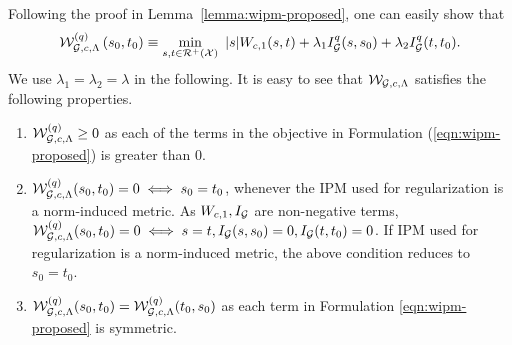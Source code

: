 Following the proof in Lemma~\ref{lemma:wipm-proposed}, one can easily show that
\begin{equation}\label{eqn:wipm-proposed}
    \mathcal{W}_{\mathcal{G}, c, \Lambda}^{(q)}\left(s_0,t_0\right) \equiv\min\limits_{s,t\in\mathcal{R}^+(\mathcal{X})}\  |s| W_{c, 1}(s,t) + \lambda_1  I_{\mathcal{G}}^q(s,s_0) + \lambda_2  I_{\mathcal{G}}^q(t,t_0).
\end{equation}
We use $\lambda_1=\lambda_2=\lambda$ in the following. 
It is easy to see that $\mathcal{W}_{\mathcal{G}, c, \Lambda}$ satisfies the following properties.
\begin{enumerate}
    \item $\mathcal{W}_{\mathcal{G}, c, \Lambda}^{(q)}\geq 0$ as each of the terms in the objective in Formulation (\ref{eqn:wipm-proposed}) is greater than 0.
    \item $\mathcal{W}_{\mathcal{G}, c, \Lambda}^{(q)}(s_0, t_0)=0\iff s_0=t_0$, whenever the IPM used for regularization is a norm-induced metric. As $W_{c, 1},  I_{\mathcal{G}}$ are non-negative terms, $\mathcal{W}_{\mathcal{G}, c, \Lambda}^{(q)}(s_0, t_0)=0\iff s=t,  I_{\mathcal{G}}(s, s_0)=0,  I_{\mathcal{G}}(t, t_0)=0$. If IPM used for regularization is a norm-induced metric, the above condition reduces to $s_0=t_0$. 
    \item $\mathcal{W}_{\mathcal{G}, c, \Lambda}^{(q)}(s_0, t_0)=\mathcal{W}_{\mathcal{G}, c, \Lambda}^{(q)}(t_0, s_0)$ as each term in Formulation \ref{eqn:wipm-proposed} is symmetric.
\end{enumerate}

